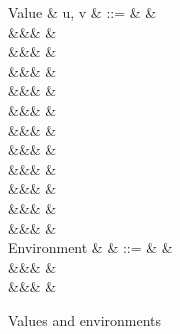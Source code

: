\begin{figure}
\begin{syntaxfig}
\small
\mbox{Value}
&
u, v
&
::=
&
&
\\
&&&
\exUnit
&
\\
&&&
&
\\
&&&
&
\\
&&&
&
\\
&&&
&
\\
&&&
&
\\
&&&
&
\\
&&&
&
\\
&&&
\exClosure{\rho}{\exFun{\sigma}}
&
\\
&&&
&
\\
&&&
&
\\[1mm]
\mbox{Environment}
&
\rho
&
::=
&
\envEmpty
&
\\
&&&
&
\\
&&&
&
\end{syntaxfig}
\caption{Values and environments}
\end{figure}
